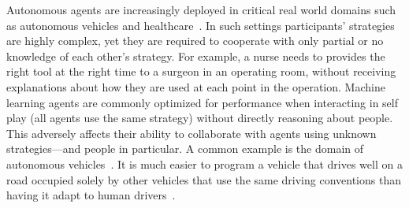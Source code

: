 \documentclass[letterpaper]{article} %
\begin{document}
  Autonomous agents are increasingly deployed  in critical real world domains such as  autonomous vehicles and healthcare~\cite{navarro2017machine,wiens}.
  In such settings   participants' strategies are highly complex, yet they are required to cooperate with only partial or no knowledge of each other's strategy.  For example, a nurse  needs to provides the right tool at the right time  to a surgeon in an operating room, without receiving  explanations about how they are used at each point in the operation.  
   Machine learning agents are commonly optimized for performance when interacting in self play (all agents use the same strategy) without directly reasoning about  people. 
   This adversely affects their ability to collaborate with agents using unknown strategies---and people in particular.
   A common example is the domain of  autonomous vehicles~\cite{nunes2018people}. It is much easier to program a vehicle that drives well on a road occupied solely by other vehicles that use the same driving conventions than having it adapt to human drivers~\cite{dresner2007sharing}.    
 
 

\end{document}
